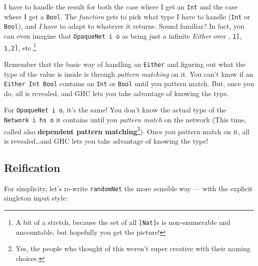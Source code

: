 \documentclass[]{article}
\begin{document}
I have to handle the result for both the case where I get an \texttt{Int} and
the case where I get a \texttt{Bool}. The \emph{function} gets to pick what type
I have to handle (\texttt{Int} or \texttt{Bool}), and \emph{I} have to adapt to
whatever it returns. Sound familiar? In fact, you can even imagine that
\texttt{OpaqueNet\ i\ o} as being just a infinite \emph{Either} over
\texttt{\textquotesingle{}{[}{]}}, \texttt{\textquotesingle{}{[}1{]}},
\texttt{\textquotesingle{}{[}1,2{]}}, etc.\footnote{A bit of a stretch, because
  the set of all \texttt{{[}Nat{]}}s is non-enumerable and uncountable, but
  hopefully you get the picture!}

Remember that the basic way of handling an \texttt{Either} and figuring out what
the type of the value is inside is through \emph{pattern matching} on it. You
can't know if an \texttt{Either\ Int\ Bool} contains an \texttt{Int} or
\texttt{Bool} until you pattern match. But, once you do, all is revealed, and
GHC lets you take advantage of knowing the type.

For \texttt{OpaqueNet\ i\ o}, it's the same! You don't know the actual type of
the \texttt{Network\ i\ hs\ o} it contains until you \emph{pattern match} on the
network (This time, called also \textbf{dependent pattern matching}\footnote{Yes,
  the people who thought of this weren't super creative with their naming
  choices.}). Once you pattern match on it, all is revealed\ldots{}and GHC lets
you take advantage of knowing the type!

\subsection{Reification}\label{reification}

For simplicity, let's re-write \texttt{randomNet} the more sensible way --- with
the explicit singleton input style:
\end{document}
